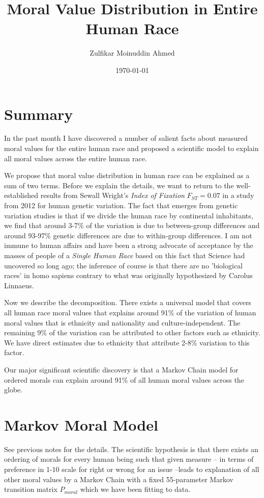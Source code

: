 \documentclass{amsart}
\title{Moral Value Distribution in Entire Human Race}
\author{Zulfikar Moinuddin Ahmed}
\date{\today}
\begin{document}
\maketitle

\section{Summary}

In the past month I have discovered a number of salient facts about measured moral values for the entire human race and proposed a scientific model to explain all moral values across the entire human race.

We propose that moral value distribution in human race can be explained as a sum of two terms.  Before we explain the details, we want to return to the well-established results from Sewall Wright's {\em Index of Fixation} $F_{ST} = 0.07$ in a study from 2012 for human genetic variation.  The fact that emerges from genetic variation studies is that if we divide the human race by continental inhabitants, we find that around 3-7\% of the variation is due to between-group differences and around 93-97\% genetic differences are due to within-group differences.  I am not immune to human affairs and have been a strong advocate of acceptance by the masses of people of a {\em Single Human Race} based on this fact that Science had uncovered so long ago; the inference of course is that there are no 'biological races' in homo sapiens contrary to what was originally hypothesized by Carolus Linnaeus.

Now we describe the decomposition.  There exists a universal model that covers all human race moral values that explains around 91\% of the variation of human moral values that is ethnicity and nationality and culture-independent.  The remaining 9\% of the variation can be attributed to other factors such as ethnicity.  We have direct estimates due to ethnicity that attribute 2-8\% variation to this factor.  

Our major significant scientific discovery is that a Markov Chain model for ordered morals can explain around 91\% of all human moral values across the globe.

\section{Markov Moral Model}

See previous notes for the details.  The scientific hypothesis is that there exists an ordering of morals for every human being such that given measure -- in terms of preference in 1-10 scale for right or wrong for an issue --leads to explanation of all other moral values by a Markov Chain with a fixed 55-parameter Markov transition matrix $P_{moral}$ which we have been fitting to data.  
\end{document}
